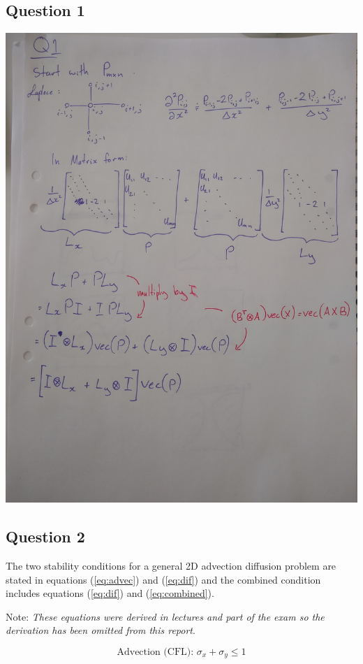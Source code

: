 \documentclass[10pt,a4paper]{article}
\begin{document}
\subsection{Question 1}
\includegraphics[width=\textwidth]{Q1.jpg}

\newpage
\subsection{Question 2}
The two stability conditions for a general 2D advection diffusion problem are stated in equations (\ref{eq:advec}) and (\ref{eq:dif}) and the combined condition includes equations (\ref{eq:dif}) and (\ref{eq:combined}).

\noindent Note: \textit{These equations were derived in lectures and part of the exam so the derivation has been omitted from this report}.

\begin{equation}
\label{eq:advec}
\text{Advection (CFL):  } \sigma_x + \sigma_y \leq 1 
\end{equation}
\end{document}
